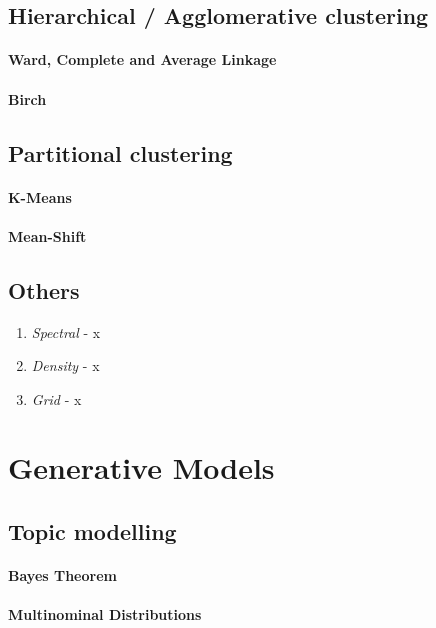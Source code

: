   \subsection{Hierarchical / Agglomerative clustering}
    \paragraph{Ward, Complete and Average Linkage}
    \paragraph{Birch}

  \subsection{Partitional clustering}
    \paragraph{K-Means}
    \paragraph{Mean-Shift}

    \subsection{Others}
      \begin{enumerate}
        \item \emph{Spectral} - x
        \item \emph{Density} - x
        \item \emph{Grid} - x
      \end{enumerate}


\section{Generative Models}    
  
  \subsection{Topic modelling}
    \paragraph{Bayes Theorem}
    \paragraph{Multinominal Distributions}
